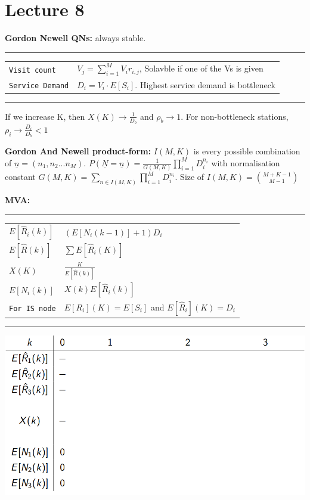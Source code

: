 \section{Lecture 8}
\textbf{Gordon Newell QNs:} always stable.

\hrule
{}
\begin{tabular}{@{}p{\the\MyLen}@{}p{\linewidth-\the\MyLen}@{}}
\verb!Visit count!	&  $V_j = \sum^M_{i=1} V_ir_{i,j}$, Solavble if one of the Vs is given\\
\verb!Service Demand!	&  $D_i = V_i \cdot E[S_i]$. Highest service demand is bottleneck\\
\end{tabular}
\hrule
If we increase K, then $X(K) \rightarrow \frac{1}{D_b}$ and $\rho_b \rightarrow 1$. For non-bottleneck stations, $\rho_i \rightarrow \frac{D_i}{D_b} < 1$

\textbf{Gordon And Newell product-form:} $I(M,K)$ is every possible combination of $\underline{n} = (n_1, n_2 ... n_M)$. $P(\underline{N} = \underline{n}) = \frac{1}{G(M,K)} \prod^M_{i=1} D_i^{n_i}$ with normalisation constant $G(M,K) = \sum_{n \in I(M,K)} \prod_{i=1}^M D_i^{n_i}$. Size of $I(M,K) = {M+K-1 \choose M-1}$

\textbf{MVA:} 

\hrule
{}
\begin{tabular}{@{}p{\the\MyLen}@{}p{\linewidth-\the\MyLen}@{}}
$E[\hat{R}_i(k)]$ 	&  $(E[N_i(k-1)] + 1)D_i$\\
$E[\hat{R}(k)]$ 	&  $\sum E[\hat{R}_i(K)]$\\
$X(K)$ 				&  $\frac{K}{E[\hat{R}(k)]}$\\
$E[N_i(k)]$ 		&  $X(k)E[\hat{R}_i(k)]$\\
\verb!For IS node!  &  $E[R_i](K) = E[S_i]$ and $E[\hat{R}_i](K) = D_i$
\end{tabular}
\newline
\hrule
\includegraphics[scale=0.2]{images/MVA.png}

